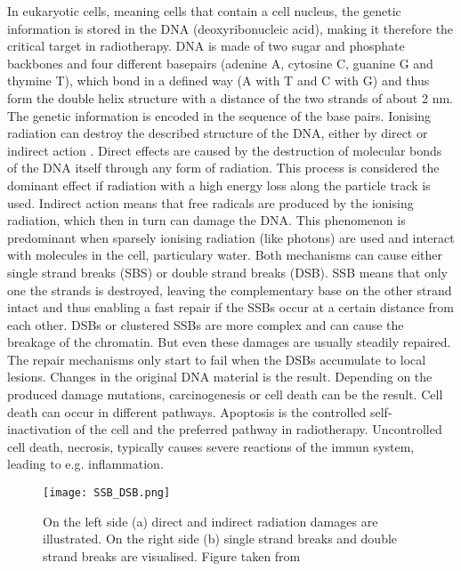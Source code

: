 \documentclass[type=dr, dr=rernat, accentcolor=tud7b,colorbacktitle, bigchapter, openright, twoside, 12pt ]{tudthesis}
\begin{document}
In eukaryotic cells, meaning cells that contain a cell nucleus, the genetic information is stored in the DNA (deoxyribonucleic acid), 
making it therefore the critical target in radiotherapy. DNA is made of two sugar and phosphate backbones and four different basepairs 
(adenine A, cytosine C, guanine G and thymine T), which bond in a defined way (A with T and C with G) and thus form the double helix 
structure with a distance of the two strands of about 2 nm. The genetic information is encoded in the sequence of the base pairs. 
Ionising radiation can destroy the described structure of the DNA, either by direct or indirect action \cite{Hal06}.\newline
\newline
Direct effects are caused by the destruction of molecular bonds of the DNA itself 
through any form of radiation. This process is considered the dominant effect if radiation with a high energy loss along the particle 
track is used. Indirect action means that free radicals are produced by the ionising radiation, which then in turn can damage the DNA. 
This phenomenon is predominant when sparsely ionising radiation (like photons) are used and interact with molecules in the cell, 
particulary water.\newline
\newline
Both mechanisms can cause either single strand breaks (SBS) or double strand breaks (DSB). SSB means that only one the strands is 
destroyed, leaving the complementary base on the other strand intact and thus enabling a fast repair if the SSBs occur at a certain 
distance from each other. DSBs or clustered SSBs are more complex and can cause the breakage of the chromatin. But even these 
damages are usually steadily repaired. The repair mechanisms only start to fail when the DSBs accumulate to local lesions. Changes 
in the original DNA material is the result. Depending on the produced damage mutations, carcinogenesis or cell death can be the 
result. Cell death can occur in different pathways. Apoptosis is the controlled self-inactivation of the cell and the preferred 
pathway in radiotherapy. Uncontrolled cell death, necrosis, typically causes severe reactions of the immun system, leading to e.g. 
inflammation.

\begin{figure}[H]
\begin{center}
\texttt{[image: SSB\_DSB.png]}
\caption{On the left side (a) direct and indirect radiation damages are illustrated. On the right side (b) single strand breaks and 
double strand breaks are visualised. Figure taken from \cite{Ric12}}
\end{center}
\end{figure}
\end{document}
